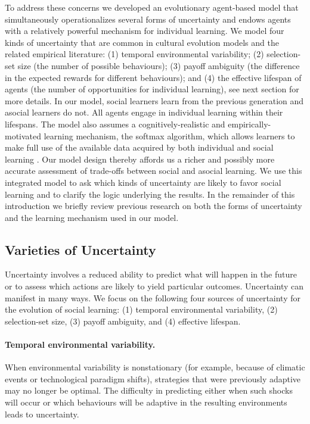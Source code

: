 \documentclass[letterpaper,11.5pt]{scrartcl}
\begin{document}
To address these concerns we developed an evolutionary agent-based model that
simultaneously operationalizes several forms of uncertainty and endows agents
with a relatively powerful mechanism for individual learning. We model four kinds of
uncertainty that are common in cultural evolution models and the related empirical
literature:  (1) temporal environmental variability; (2) selection-set size (the number of possible behaviours); (3) payoff ambiguity
(the difference in the expected rewards for different behaviours); and (4) the effective lifespan of agents (the number of
opportunities for individual learning), see next section for more details. In our model, social learners learn from the previous
generation and asocial learners do not. All agents engage in individual learning within their lifespans. The model also assumes a
cognitively-realistic and empirically-motivated learning mechanism, the softmax algorithm, which allows learners to make full use of the available data acquired by both individual and social learning \citep{SuttonBartoBook}. Our model design thereby affords us a richer and possibly more accurate assessment of trade-offs between social and asocial learning. We use this integrated model to ask which kinds of uncertainty are likely to favor social learning and to clarify the logic underlying the results.
In the remainder of this introduction we briefly review previous research on both the forms of uncertainty and the learning mechanism used in our model. 


\subsection{Varieties of Uncertainty}

Uncertainty involves a reduced ability to predict what will happen in the future or to assess which actions are likely to yield particular outcomes. Uncertainty can manifest in many ways. We focus on the following four sources of uncertainty for the evolution of social learning: (1) temporal environmental variability, (2) selection-set size, (3) payoff ambiguity, and (4) effective lifespan.

\paragraph{Temporal environmental variability.} When environmental variability is nonstationary (for example, because of climatic events %
or technological paradigm shifts), strategies that were previously adaptive may no longer be optimal. The difficulty in predicting either when such shocks will occur or which behaviours will be adaptive in the resulting environments leads to uncertainty. 
\end{document}
